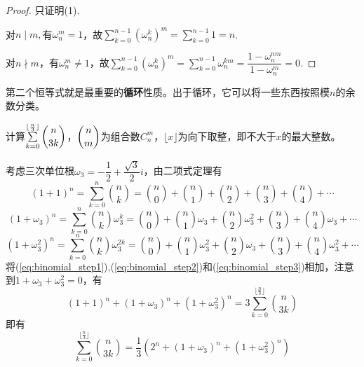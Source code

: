             \begin{proof}
                只证明(1).

                对$n\mid m,$有$\omega_n^{m}=1$，故$\sum\limits_{k=0}^{n-1}(\omega_n^{k})^{m}=\sum\limits_{k=0}^{n-1}1=n$.

                对$n\nmid m$，有$\omega_n^{m}\neq1$，故$\sum\limits_{k=0}^{n-1}(\omega_n^{k})^{m}=\sum\limits_{k=0}^{n-1}\omega_n^{km}=\dfrac{1-\omega_n^{nm}}{1-\omega_n^{m}}=0$.
            \end{proof}

            第二个恒等式就是最重要的\textbf{循环}性质。出于循环，它可以将一些东西按照模$n$的余数分类。

            \begin{example}
                计算$\sum\limits_{k=0}^{\lfloor \frac{n}{3} \rfloor}\dbinom{n}{3k}$，$\dbinom{n}{m}$为组合数$C_n^{m}$，$\lfloor x\rfloor$为向下取整，即不大于$x$的最大整数。
            \end{example}

            \begin{solution}
                考虑三次单位根$\omega_{3}=-\dfrac12+\dfrac{\sqrt{3}}{2}i$，由二项式定理有
                \begin{equation}
                    \label{eq:binomial_step1}
                    (1+1)^n=\sum_{k=0}^n\binom{n}{k}=\binom{n}{0}+\binom{n}{1}+\binom{n}{2}+\binom{n}{3}+\binom{n}{4}+\cdots
                \end{equation}
                \begin{equation}
                    \label{eq:binomial_step2}
                    (1+\omega_{3})^n=\sum_{k=0}^n\binom{n}{k}\omega_{3}^{k}=\binom{n}{0}+\binom{n}{1}\omega_{3}+\binom{n}{2}\omega_{3}^{2}+\binom{n}{3}+\binom{n}{4}\omega_{3}+\cdots
                \end{equation}
                \begin{equation}
                    \label{eq:binomial_step3}
                    (1+\omega_{3}^{2})^n=\sum_{k=0}^n\binom{n}{k}\omega_{3}^{2k}= \binom{n}{0}+\binom{n}{1}\omega_{3}^{2}+\binom{n}{2}\omega_{3}+\binom{n}{3}+\binom{n}{4}\omega_{3}^{2}+\cdots
                \end{equation}
                将(\ref{eq:binomial_step1}),(\ref{eq:binomial_step2})和(\ref{eq:binomial_step3})相加，注意到$1+\omega_{3}+\omega_{3}^{2}=0$，有
                \begin{equation}
                    \label{eq:binomial_step4}
                    (1+1)^n+(1+\omega_{3})^n+(1+\omega_{3}^{2})^n=3\sum_{k=0}^{\lfloor \frac{n}{3} \rfloor}\binom{n}{3k}
                    \nonumber
                \end{equation}
                即有
                \begin{equation}
                    \label{eq:binomial_step5}
                    \sum_{k=0}^{\lfloor \frac{n}{3} \rfloor}\binom{n}{3k}=\frac13(2^n+(1+\omega_{3})^n+(1+\omega_{3}^{2})^n)
                    \nonumber
                \end{equation}
            \end{solution}

